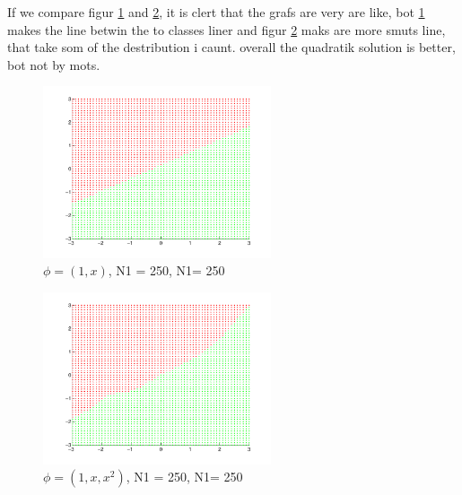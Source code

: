 If we compare figur \ref{fig:q25a} and \ref{fig:q25b}, it is clert that
the grafs are very are like, bot \ref{fig:q25a} makes the line betwin
the to classes liner and figur \ref{fig:q25b} maks are more smuts line,
that take som of the destribution i caunt. overall the quadratik
solution is better, bot not by mots.

\begin{figure}[!htbp]
  \centering
  \includegraphics[width=0.6\textwidth]{./images/q25a.pdf}
  \caption{$\phi = (1,x)$, N1 = 250, N1= 250}
  \label{fig:q25a}
\end{figure}

\begin{figure}[!htbp]
  \centering
  \includegraphics[width=0.6\textwidth]{./images/q25b.pdf}
  \caption{$\phi = (1,x, x^2)$, N1 = 250, N1= 250}
  \label{fig:q25b}
\end{figure}

